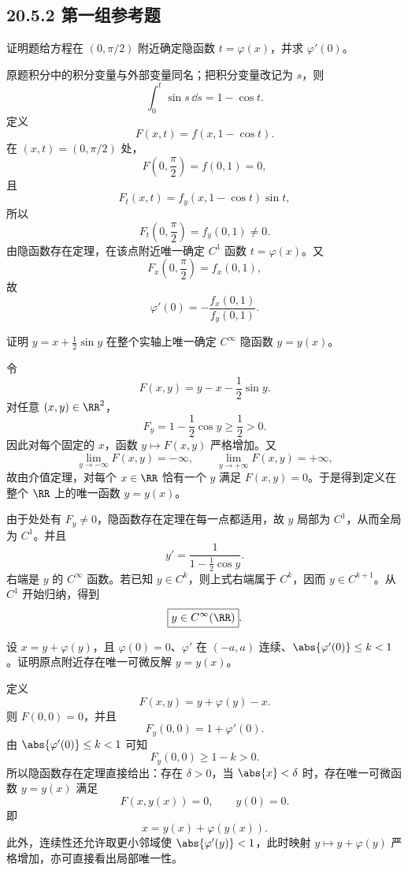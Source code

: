 \subsection*{20.5.2 第一组参考题}

\begin{xreferenceproblem}[20.5.2 第一组参考题 1]
证明题给方程在 $\left(0,\pi/2\right)$ 附近确定隐函数 $t=\varphi(x)$，并求 $\varphi'(0)$。
\end{xreferenceproblem}
\begin{xsolution}
原题积分中的积分变量与外部变量同名；把积分变量改记为 $s$，则
\[
  \int_0^t\sin s\,\dd s=1-\cos t.
\]
定义
\[
  F(x,t)=f(x,1-\cos t).
\]
在 $(x,t)=(0,\pi/2)$ 处，
\[
  F\left(0,\frac\pi2\right)=f(0,1)=0,
\]
且
\[
  F_t(x,t)=f_y(x,1-\cos t)\sin t,
\]
所以
\[
  F_t\left(0,\frac\pi2\right)=f_y(0,1)\ne0.
\]
由隐函数存在定理，在该点附近唯一确定 $C^1$ 函数 $t=\varphi(x)$。又
\[
  F_x\left(0,\frac\pi2\right)=f_x(0,1),
\]
故
\[
  \boxed{\displaystyle
    \varphi'(0)=-\frac{f_x(0,1)}{f_y(0,1)}}.
\]
\end{xsolution}

\begin{xreferenceproblem}[20.5.2 第一组参考题 2]
证明 $y=x+\tfrac12\sin y$ 在整个实轴上唯一确定 $C^\infty$ 隐函数 $y=y(x)$。
\end{xreferenceproblem}
\begin{xsolution}
令
\[
  F(x,y)=y-x-\frac12\sin y.
\]
对任意 $(x,y)\in\RR^2$，
\[
  F_y=1-\frac12\cos y\ge\frac12>0.
\]
因此对每个固定的 $x$，函数 $y\mapsto F(x,y)$ 严格增加。又
\[
  \lim_{y\to-\infty}F(x,y)=-\infty,
  \qquad
  \lim_{y\to+\infty}F(x,y)=+\infty,
\]
故由介值定理，对每个 $x\in\RR$ 恰有一个 $y$ 满足 $F(x,y)=0$。于是得到定义在整个 $\RR$ 上的唯一函数 $y=y(x)$。

由于处处有 $F_y\ne0$，隐函数存在定理在每一点都适用，故 $y$ 局部为 $C^1$，从而全局为 $C^1$。并且
\[
  y'=\frac1{1-\frac12\cos y}.
\]
右端是 $y$ 的 $C^\infty$ 函数。若已知 $y\in C^k$，则上式右端属于 $C^k$，因而 $y\in C^{k+1}$。从 $C^1$ 开始归纳，得到
\[
  \boxed{y\in C^\infty(\RR)}.
\]
\end{xsolution}

\begin{xreferenceproblem}[20.5.2 第一组参考题 3]
设 $x=y+\varphi(y)$，且 $\varphi(0)=0$、$\varphi'$ 在 $(-a,a)$ 连续、$\abs{\varphi'(0)}\le k<1$。证明原点附近存在唯一可微反解 $y=y(x)$。
\end{xreferenceproblem}
\begin{xsolution}
定义
\[
  F(x,y)=y+\varphi(y)-x.
\]
则 $F(0,0)=0$，并且
\[
  F_y(0,0)=1+\varphi'(0).
\]
由 $\abs{\varphi'(0)}\le k<1$ 可知
\[
  F_y(0,0)\ge1-k>0.
\]
所以隐函数存在定理直接给出：存在 $\delta>0$，当 $\abs{x}<\delta$ 时，存在唯一可微函数 $y=y(x)$ 满足
\[
  F(x,y(x))=0,
  \qquad y(0)=0.
\]
即
\[
  x=y(x)+\varphi(y(x)).
\]
此外，连续性还允许取更小邻域使 $\abs{\varphi'(y)}<1$，此时映射 $y\mapsto y+\varphi(y)$ 严格增加，亦可直接看出局部唯一性。
\end{xsolution}

